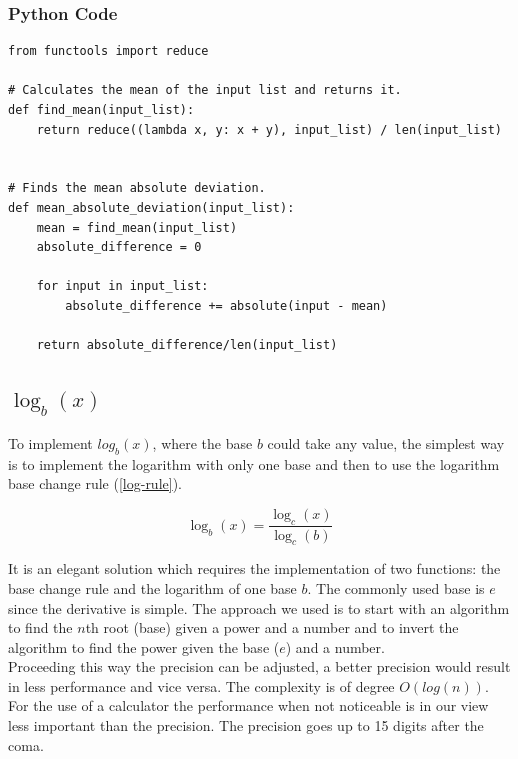 \documentclass[11pt,onside]{report}
\begin{document}
\subsubsection{Python Code}
\begin{lstlisting}
from functools import reduce

# Calculates the mean of the input list and returns it.
def find_mean(input_list):
	return reduce((lambda x, y: x + y), input_list) / len(input_list)


# Finds the mean absolute deviation.
def mean_absolute_deviation(input_list):
	mean = find_mean(input_list)
	absolute_difference = 0
	
	for input in input_list:
		absolute_difference += absolute(input - mean)
		
	return absolute_difference/len(input_list)
\end{lstlisting}

\subsection{$\log_b(x)$}
To implement $log_b(x)$, where the base $b$ could take any value, the simplest way is to implement the logarithm with only one base and then to use the logarithm base change rule (\ref{log-rule}).

\begin{equation} \label{log-rule}
    \log_b(x) = \frac{\log_c(x)}{\log_c(b)}
\end{equation}

It is an elegant solution which requires the implementation of two functions: the base change rule and the logarithm of one base $b$. The commonly used base is $e$ since the derivative is simple. The approach we used is to start with an algorithm to find the $n$th root (base) given a power and a number and to invert the algorithm to find the power given the base ($e$) and a number. \\

Proceeding this way the precision can be adjusted, a better precision would result in less performance and vice versa. The complexity is of degree $O(log(n))$. For the use of a calculator the performance when not noticeable is in our view less important than the precision. The precision goes up to 15 digits after the coma.
\end{document}
